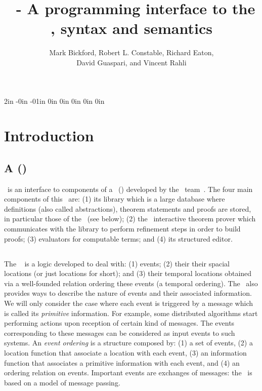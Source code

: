 \documentclass[final]{article}
\title{\eml\ - A programming interface to the \logicE, syntax and semantics}
\author{Mark Bickford,
       Robert L. Constable,
       Richard Eaton,\\
       David Guaspari, and
       Vincent Rahli}
\begin{document}
\changepage{1in}%
           {2in}%
           {-0in}%
           {-01in}%
           {0in}%
           {0in}%
           {0in}%
           {0in}%
           {0in}%


\maketitle


\listoffixmes


\section{Introduction}




\subsection{A \logicalPE (\LPE)}


%
\eml\ is an interface to components of a
\logicalPE\ (\LPE) developed by the \prl\ team~\cite{Allen+al:2006}.
%
The four main components of this \LPE\ are: (1) its library which is a
large database where definitions (also called abstractions), theorem
statements and proofs are stored, in particular those of the
\logicE\ (see below); (2) the \nuprl\ interactive theorem prover which
communicates with the library to perform refinement steps in order to
build proofs; (3) evaluators for computable terms; and (4) its
structured editor.


\subsection{\logicE}


The \logicE~\cite{Bickford:2009,Bickford+Constable:2008} is a logic
developed to deal with: (1) events; (2) their their spacial locations
(or just locations for short); and (3) their temporal locations
obtained via a well-founded relation ordering these events (a temporal
ordering).  The \logicE\ also provides ways to describe the nature of
events
and their associated information.  We will only consider the case
where each event is triggered by a message which is called its
\emph{primitive} information.  For example, some distributed
algorithms start performing actions upon reception of certain kind of
messages.  The events corresponding to these messages can be
considered as input events to such systems.
%
An \emph{event ordering} is a structure composed by: (1) a set of
events, (2) a location function that associate a location with each
event, (3) an information function that associates a primitive
information with each event, and (4) an ordering relation on events.
%
Important events are exchanges of messages: the \logicE\ is based on a
model of message passing.
\end{document}
